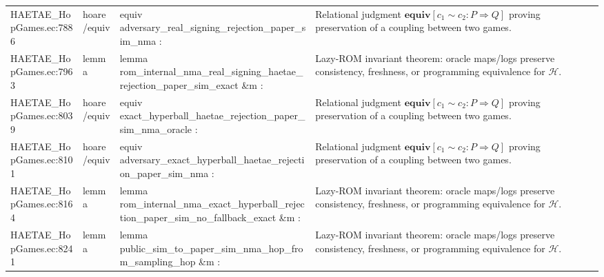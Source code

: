 \documentclass[10pt]{article}
\begin{document}
\begin{longtable}{L{0.11\textwidth}L{0.055\textwidth}L{0.385\textwidth}L{0.41\textwidth}}
HAETAE\_\allowbreak{}HopGames.\allowbreak{}ec:\allowbreak{}7886 & hoare/equiv & {\ttfamily\scriptsize equiv adversary\_\allowbreak{}real\_\allowbreak{}signing\_\allowbreak{}rejection\_\allowbreak{}paper\_\allowbreak{}sim\_\allowbreak{}nma :} & Relational judgment $\mathbf{equiv}[c_1\sim c_2:P\Rightarrow Q]$ proving preservation of a coupling between two games. \\
HAETAE\_\allowbreak{}HopGames.\allowbreak{}ec:\allowbreak{}7963 & lemma & {\ttfamily\scriptsize lemma rom\_\allowbreak{}internal\_\allowbreak{}nma\_\allowbreak{}real\_\allowbreak{}signing\_\allowbreak{}haetae\_\allowbreak{}rejection\_\allowbreak{}paper\_\allowbreak{}sim\_\allowbreak{}exact \&m :} & Lazy-ROM invariant theorem: oracle maps/logs preserve consistency, freshness, or programming equivalence for $\mathcal H$. \\
HAETAE\_\allowbreak{}HopGames.\allowbreak{}ec:\allowbreak{}8039 & hoare/equiv & {\ttfamily\scriptsize equiv exact\_\allowbreak{}hyperball\_\allowbreak{}haetae\_\allowbreak{}rejection\_\allowbreak{}paper\_\allowbreak{}sim\_\allowbreak{}nma\_\allowbreak{}oracle :} & Relational judgment $\mathbf{equiv}[c_1\sim c_2:P\Rightarrow Q]$ proving preservation of a coupling between two games. \\
HAETAE\_\allowbreak{}HopGames.\allowbreak{}ec:\allowbreak{}8101 & hoare/equiv & {\ttfamily\scriptsize equiv adversary\_\allowbreak{}exact\_\allowbreak{}hyperball\_\allowbreak{}haetae\_\allowbreak{}rejection\_\allowbreak{}paper\_\allowbreak{}sim\_\allowbreak{}nma :} & Relational judgment $\mathbf{equiv}[c_1\sim c_2:P\Rightarrow Q]$ proving preservation of a coupling between two games. \\
HAETAE\_\allowbreak{}HopGames.\allowbreak{}ec:\allowbreak{}8164 & lemma & {\ttfamily\scriptsize lemma rom\_\allowbreak{}internal\_\allowbreak{}nma\_\allowbreak{}exact\_\allowbreak{}hyperball\_\allowbreak{}rejection\_\allowbreak{}paper\_\allowbreak{}sim\_\allowbreak{}no\_\allowbreak{}fallback\_\allowbreak{}exact \&m :} & Lazy-ROM invariant theorem: oracle maps/logs preserve consistency, freshness, or programming equivalence for $\mathcal H$. \\
HAETAE\_\allowbreak{}HopGames.\allowbreak{}ec:\allowbreak{}8241 & lemma & {\ttfamily\scriptsize lemma public\_\allowbreak{}sim\_\allowbreak{}to\_\allowbreak{}paper\_\allowbreak{}sim\_\allowbreak{}nma\_\allowbreak{}hop\_\allowbreak{}from\_\allowbreak{}sampling\_\allowbreak{}hop \&m :} & Lazy-ROM invariant theorem: oracle maps/logs preserve consistency, freshness, or programming equivalence for $\mathcal H$. \\

\end{longtable}
\end{document}
